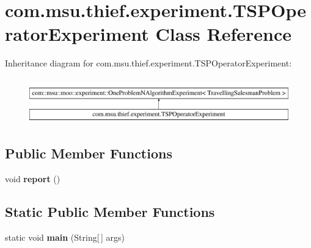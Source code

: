 \hypertarget{classcom_1_1msu_1_1thief_1_1experiment_1_1TSPOperatorExperiment}{\section{com.\-msu.\-thief.\-experiment.\-T\-S\-P\-Operator\-Experiment Class Reference}
\label{classcom_1_1msu_1_1thief_1_1experiment_1_1TSPOperatorExperiment}
}
Inheritance diagram for com.\-msu.\-thief.\-experiment.\-T\-S\-P\-Operator\-Experiment\-:\begin{figure}[H]
\begin{center}
\leavevmode
\includegraphics[height=2.000000cm]{classcom_1_1msu_1_1thief_1_1experiment_1_1TSPOperatorExperiment}
\end{center}
\end{figure}
\subsection*{Public Member Functions}
\begin{DoxyCompactItemize}
\item 
\hypertarget{classcom_1_1msu_1_1thief_1_1experiment_1_1TSPOperatorExperiment_a7a38886831cd2f89cac6baa22c9d5683}{void {\bfseries report} ()}\label{classcom_1_1msu_1_1thief_1_1experiment_1_1TSPOperatorExperiment_a7a38886831cd2f89cac6baa22c9d5683}

\end{DoxyCompactItemize}
\subsection*{Static Public Member Functions}
\begin{DoxyCompactItemize}
\item 
\hypertarget{classcom_1_1msu_1_1thief_1_1experiment_1_1TSPOperatorExperiment_a7016b060abe4c7124a5bf6b185e9c0cb}{static void {\bfseries main} (String\mbox{[}$\,$\mbox{]} args)}\label{classcom_1_1msu_1_1thief_1_1experiment_1_1TSPOperatorExperiment_a7016b060abe4c7124a5bf6b185e9c0cb}

\end{DoxyCompactItemize}
